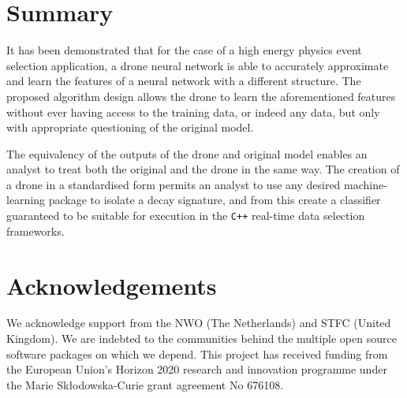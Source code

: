 \documentclass[final,5p,times,twocolumn]{elsarticle}
\begin{document}
\section{Summary}
\label{sec:summary}

It has been demonstrated that for the case of a high energy physics
event selection application, a drone neural network is able to accurately
approximate and learn the features of a neural network with a different
structure. The proposed algorithm design allows the drone to learn the
aforementioned features without ever having access to the training data,
or indeed any data, but only with appropriate questioning of the original model.

The equivalency of the outputs of the drone and original model enables an
analyst to treat both the original and the drone in the same way. The creation
of a drone in a standardised form permits an analyst to use any desired machine-learning
package to isolate a decay signature, and from this create a classifier
guaranteed to be suitable for execution in the {\tt C++} real-time data selection frameworks.


\section*{Acknowledgements}

\noindent 
We acknowledge support from 
the NWO (The Netherlands) and STFC (United Kingdom).
We are indebted to the communities behind the multiple open 
source software packages on which we depend.
This project has received funding from the European Union’s Horizon 
2020 research and innovation programme under the Marie Skłodowska-Curie 
grant agreement No 676108.
\end{document}

